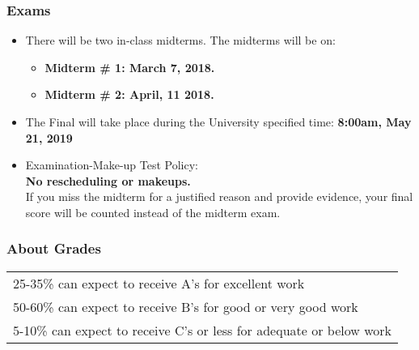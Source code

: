 \documentclass[9pt]{beamer}
\begin{document}

\begin{frame}[t]
\frametitle{Exams}
\begin{itemize}
\item There will be two in-class midterms. The midterms will be on:
\begin{itemize}
\medskip
\item\textbf{Midterm \# 1: March 7, 2018.}
\medskip
\item\textbf{Midterm \# 2: April, 11 2018.}
\end{itemize}
\bigskip
\item The Final will take place during the University specified time: \textbf{8:00am, May
21, 2019}
\bigskip
\item Examination-Make-up Test Policy:\\
\medskip
\textbf{No rescheduling or makeups.}\\
\medskip
If you miss the midterm for a justified reason and provide
evidence, your final score will be counted instead of the midterm exam.
\end{itemize}
\end{frame}
\begin{frame}[t]
\frametitle{About Grades}
\bigskip
\begin{table}[t]
\setlength {\tabcolsep}{3.75mm}
\vspace{0.01cm}
\renewcommand{\arraystretch}{1.75}
\begin{center}
\begin{tabular}{l}
\hline
25-35\% can expect to receive A's for excellent work \\
50-60\% can expect to receive B's for good or very good work \\
5-10\% can expect to receive C's or less for adequate or below work \\
\hline
\end{tabular}
\end{center}
\end{table}
\end{frame}

\end{document}
